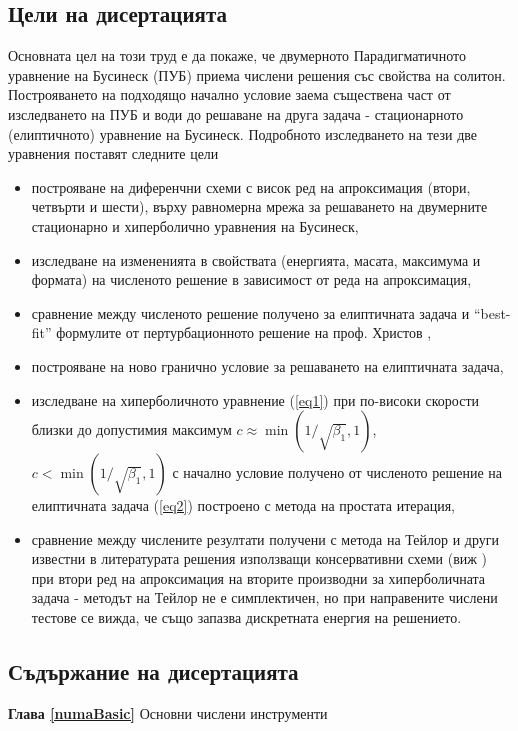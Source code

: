 \documentclass{article}
\newcommand{\rf}[1]{(\ref{#1})}
\theoremstyle{remark}
\begin{document}
\subsection{Цели на дисертацията}
Основната цел на този труд е да покаже, че двумерното Парадигматичното уравнение на Бусинеск (ПУБ) приема числени решения със свойства на солитон. Построяването на подходящо начално условие заема съществена част от изследването на ПУБ и води до решаване на друга задача - стационарното (елиптичното) уравнение на Бусинеск. Подробното изследването на тези две уравнения поставят следните цели
\begin{itemize}
  \item построяване на диференчни схеми с висок ред на апроксимация (втори, четвърти и шести), върху равномерна мрежа за решаването на двумерните стационарно и хиперболично уравнения на Бусинеск, 
  \item изследване на измененията в свойствата (енергията, масата, максимума и формата) на численото решение в зависимост от реда на апроксимация,
  \item сравнение между численото решение получено за елиптичната задача и ``best-fit'' формулите от пертурбационното решение на проф. Христов \cite{Ch2011},
  \item построяване на ново гранично условие за решаването на елиптичната задача,
  \item изследване на хиперболичното уравнение \rf{eq1} при по-високи скорости близки до допустимия максимум $c \approx \min (1/ \sqrt{\beta_1},1)$, $c < \min (1/ \sqrt{\beta_1},1)$ с начално условие получено от численото решение на елиптичната задача \rf{eq2} построено с метода на простата итерация,
  \item сравнение между числените резултати получени с метода на Тейлор и други известни в литературата решения използващи консервативни схеми (виж \cite{ref20, ref23}) при втори ред на апроксимация на вторите производни за хиперболичната задача - методът на Тейлор не е симплектичен, но при направените числени тестове се вижда, че също запазва дискретната енергия на решението.
\end{itemize}

\subsection{Съдържание на дисертацията}
 
\hspace*{\parindent}\textbf{Глава \ref{numaBasic}} Основни числени инструменти
\end{document}
